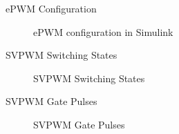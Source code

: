 \begin{frame}{ePWM Configuration}
	\begin{figure}
		\centering
		\caption{ePWM configuration in Simulink}
	\end{figure}
\end{frame}



\begin{frame}{SVPWM Switching States}
	\begin{figure}
		\centering
		\caption{SVPWM Switching States}
	\end{figure}
\end{frame}


\begin{frame}{SVPWM Gate Pulses}
	\begin{figure}
		\centering
		\caption{SVPWM Gate Pulses}
	\end{figure}
\end{frame}


